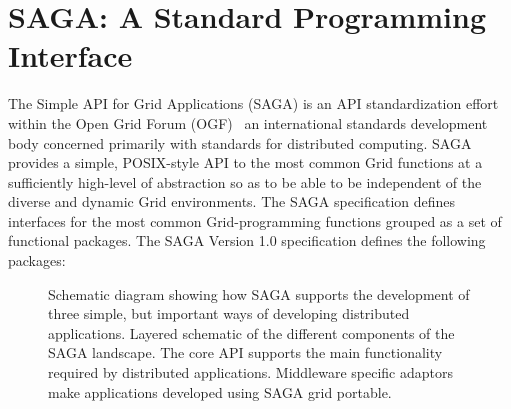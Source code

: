 \documentclass{llncs}
\begin{document}



\section{SAGA: A Standard Programming Interface}

The Simple API for Grid Applications (SAGA) is an API standardization
effort within the Open Grid Forum (OGF)~\cite{ogf_web} an
international standards development body concerned primarily with
standards for distributed computing.  SAGA provides a simple,
POSIX-style API to the most common Grid functions at a sufficiently
high-level of abstraction so as to be able to be independent of the
diverse and dynamic Grid environments.  The SAGA specification defines
interfaces for the most common Grid-programming functions grouped as a
set of functional packages.  The SAGA Version 1.0 specification
defines the following packages:

\begin{figure}[!h]
  \begin{center}
  \end{center}
  \caption{Schematic diagram showing how SAGA supports the development
    of three simple, but important ways of developing distributed
    applications. Layered schematic of the different components of the
    SAGA landscape. The core API supports the main functionality
    required by distributed applications.  Middleware specific
    adaptors make applications developed using SAGA grid portable.}
  \label{sagalayer}
\end{figure}
\end{document}
